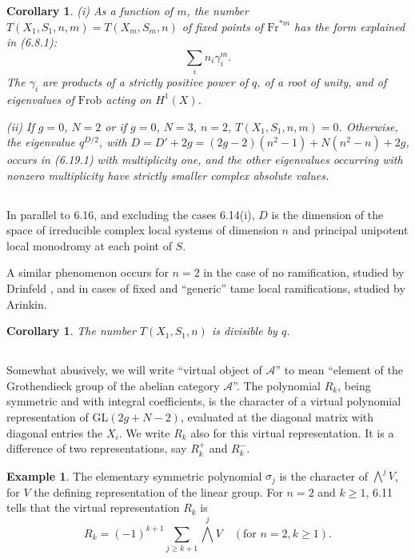 \documentclass[11pt,a4paper]{article}
\theoremstyle{plain}
\newtheorem{corollary}[theorem]{Corollary}
\theoremstyle{definition}
\newtheorem{example}[theorem]{Example}
\newcommand{\GL}{\mathrm{GL}}
\newcommand{\Frob}{\mathrm{Frob}}
\newcommand{\Fr}{\mathrm{Fr}}
\begin{document}
\begin{corollary}
\emph{(i)} As a function of $m$, the number $T(X_1,S_1,n,m) = T(X_m,S_m,n)$ of fixed points of $\Fr^{*m}$ has the form explained in (6.8.1):
\begin{equation}
\sum_i n_i \gamma_i^m. \tag{6.19.1}
\end{equation}
The $\gamma_i$ are products of a strictly positive power of $q$, of a root of unity, and of eigenvalues of $\Frob$ acting on $H^1(X)$.

\emph{(ii)} If $g = 0$, $N = 2$ or if $g = 0$, $N = 3$, $n = 2$, $T(X_1,S_1,n,m) = 0$. Otherwise, the eigenvalue $q^{D/2}$, with $D = D' + 2g = (2g - 2)(n^2 - 1) + N(n^2 - n) + 2g$, occurs in (6.19.1) with multiplicity one, and the other eigenvalues occurring with nonzero multiplicity have strictly smaller complex absolute values.
\end{corollary}

\subsection{}
In parallel to 6.16, and excluding the cases 6.14(i), $D$ is the dimension of the space of irreducible complex local systems of dimension $n$ and principal unipotent local monodromy at each point of $S$.

A similar phenomenon occurs for $n = 2$ in the case of no ramification, studied by Drinfeld \cite{D}, and in cases of fixed and ``generic'' tame local ramifications, studied by Arinkin.

\begin{corollary}
The number $T(X_1, S_1, n)$ is divisible by $q$.
\end{corollary}

\subsection{}
Somewhat abusively, we will write ``virtual object of $\mathcal{A}$'' to mean ``element of the Grothendieck group of the abelian category $\mathcal{A}$''. The polynomial $R_k$, being symmetric and with integral coefficients, is the character of a virtual polynomial representation of $\GL(2g + N - 2)$, evaluated at the diagonal matrix with diagonal entries the $X_i$. We write $R_k$ also for this virtual representation. It is a difference of two representations, say $R_k^+$ and $R_k^-$.

\begin{example}
The elementary symmetric polynomial $\sigma_j$ is the character of $\bigwedge^j V$, for $V$ the defining representation of the linear group. For $n = 2$ and $k \geq 1$, 6.11 tells that the virtual representation $R_k$ is
\begin{equation}
R_k = (-1)^{k+1} \sum_{j \geq k+1} \bigwedge^j V \quad (\text{for } n = 2, k \geq 1). \tag{6.23.1}
\end{equation}
\end{example}
\end{document}
